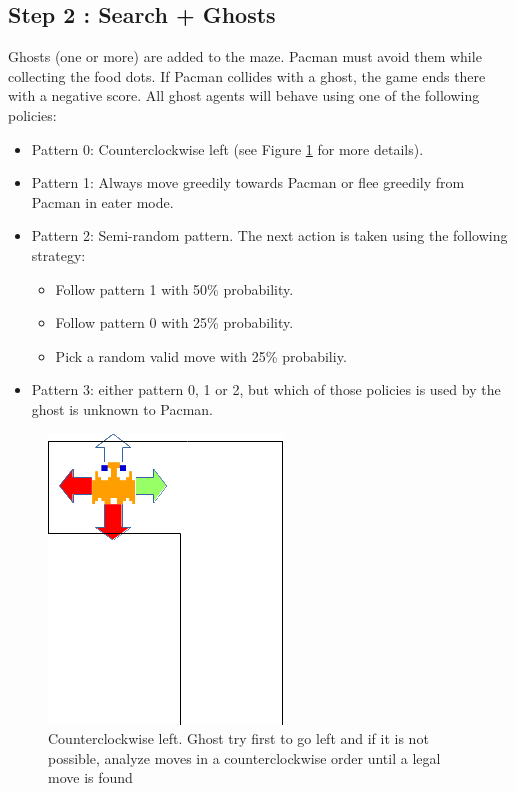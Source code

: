 \documentclass[12pt,a4paper,BCOR12mm, headexclude, footexclude, twoside, openright]{scrartcl}
\numberwithin{equation}{section} %
\numberwithin{figure}{section} %
\numberwithin{table}{section} %
\begin{document}
\subsection{Step 2 : Search + Ghosts}

Ghosts (one or more) are added to the maze. Pacman must avoid them while
collecting the food dots. If Pacman collides with a ghost, the game ends there
with a negative score. All ghost agents will behave using one of the following
policies:

\begin{itemize}
	\item Pattern 0: Counterclockwise left (see Figure \ref{counterclockwise} for more details).
    \item Pattern 1: Always move greedily towards Pacman or flee greedily from Pacman in eater mode.
    \item Pattern 2: Semi-random pattern. The next action is taken using the following strategy:
    \begin{itemize}
    	\item Follow pattern 1 with 50\% probability.
        \item Follow pattern 0 with 25\% probability.
        \item Pick a random valid move with 25\% probabiliy.
    \end{itemize}
    \item Pattern 3: either pattern 0, 1 or 2, but which of those policies is used by the ghost is unknown to Pacman.
\end{itemize}

\begin{figure}
	\label{counterclockwise}
	\begin{center}

	\includegraphics[scale=1]{ghostclockwiseleft.png}
    \caption{Counterclockwise left. Ghost try first to go left and if it is not possible, analyze moves in a counterclockwise order until a legal move is found}
    \end{center}
\end{figure}
\end{document}
